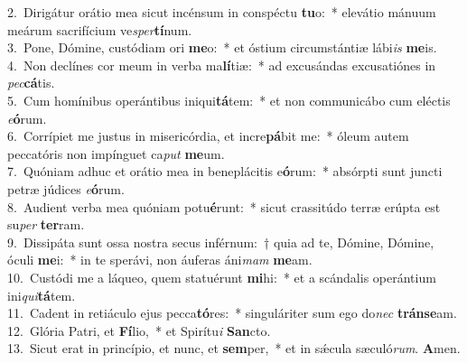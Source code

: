 {2.~}Dirigátur orátio mea sicut incénsum in conspéctu \textbf{tu}o:~* elevátio mánuum meárum sacrifícium ve\textit{sper}\textbf{tí}num.\\
{3.~}Pone, Dómine, custódiam ori \textbf{me}o:~* et óstium circumstántiæ lábi\textit{is} \textbf{me}is.\\
{4.~}Non declínes cor meum in verba ma\textbf{lí}tiæ:~* ad excusándas excusatiónes in \textit{pec}\textbf{cá}tis.\\
{5.~}Cum homínibus operántibus iniqui\textbf{tá}tem:~* et non communicábo cum eléctis \textit{e}\textbf{ó}rum.\\
{6.~}Corrípiet me justus in misericórdia, et incre\textbf{pá}bit me:~* óleum autem peccatóris non impínguet ca\textit{put} \textbf{me}um.\\
{7.~}Quóniam adhuc et orátio mea in beneplácitis e\textbf{ó}rum:~* absórpti sunt juncti petræ júdices \textit{e}\textbf{ó}rum.\\
{8.~}Audient verba mea quóniam potu\textbf{é}runt:~* sicut crassitúdo terræ erúpta est su\textit{per} \textbf{ter}ram.\\
{9.~}Dissipáta sunt ossa nostra secus inférnum:~† quia ad te, Dómine, Dómine, óculi \textbf{me}i:~* in te sperávi, non áuferas áni\textit{mam} \textbf{me}am.\\
{10.~}Custódi me a láqueo, quem statuérunt \textbf{mi}hi:~* et a scándalis operántium ini\textit{qui}\textbf{tá}tem.\\
{11.~}Cadent in retiáculo ejus pecca\textbf{tó}res:~* singuláriter sum ego do\textit{nec} \textbf{trán}\textbf{se}am.\\
{12.~}Glória Patri, et \textbf{Fí}lio,~* et Spirítu\textit{i} \textbf{San}cto.\\
{13.~}Sicut erat in princípio, et nunc, et \textbf{sem}per,~* et in sǽcula sæculó\textit{rum}. \textbf{A}men.\\
